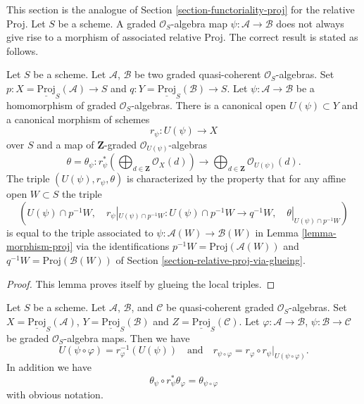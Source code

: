 \noindent
This section is the analogue of Section \ref{section-functoriality-proj}
for the relative Proj. Let $S$ be a scheme. A graded $\mathcal{O}_S$-algebra
map $\psi : \mathcal{A} \to \mathcal{B}$ does not always give rise to a
morphism of associated relative Proj. The correct result is stated as follows.

\begin{lemma}
\label{lemma-morphism-relative-proj}
Let $S$ be a scheme. Let $\mathcal{A}$, $\mathcal{B}$ be two graded
quasi-coherent $\mathcal{O}_S$-algebras. Set
$p : X = \underline{\text{Proj}}_S(\mathcal{A}) \to S$ and
$q : Y = \underline{\text{Proj}}_S(\mathcal{B}) \to S$. Let
$\psi : \mathcal{A} \to \mathcal{B}$ be a homomorphism of
graded $\mathcal{O}_S$-algebras. There is a canonical open
$U(\psi) \subset Y$ and a canonical morphism of schemes
$$
r_\psi :
U(\psi)
\longrightarrow
X
$$
over $S$ and a map of $\mathbf{Z}$-graded $\mathcal{O}_{U(\psi)}$-algebras
$$
\theta = \theta_\psi :
r_\psi^*\left(
\bigoplus\nolimits_{d \in \mathbf{Z}} \mathcal{O}_X(d)
\right)
\longrightarrow
\bigoplus\nolimits_{d \in \mathbf{Z}} \mathcal{O}_{U(\psi)}(d).
$$
The triple $(U(\psi), r_\psi, \theta)$ is characterized by the property
that for any affine open $W \subset S$ the triple
$$
(U(\psi) \cap p^{-1}W,\quad
r_\psi|_{U(\psi) \cap p^{-1}W} : U(\psi) \cap p^{-1}W \to q^{-1}W,\quad
\theta|_{U(\psi) \cap p^{-1}W})
$$
is equal to the triple associated to
$\psi : \mathcal{A}(W) \to \mathcal{B}(W)$ in
Lemma \ref{lemma-morphism-proj} via the identifications
$p^{-1}W = \text{Proj}(\mathcal{A}(W))$ and
$q^{-1}W = \text{Proj}(\mathcal{B}(W))$ of
Section \ref{section-relative-proj-via-glueing}.
\end{lemma}

\begin{proof}
This lemma proves itself by glueing the local triples.
\end{proof}

\begin{lemma}
\label{lemma-morphism-relative-proj-transitive}
Let $S$ be a scheme. Let $\mathcal{A}$, $\mathcal{B}$, and $\mathcal{C}$ be
quasi-coherent graded $\mathcal{O}_S$-algebras.
Set $X = \underline{\text{Proj}}_S(\mathcal{A})$,
$Y = \underline{\text{Proj}}_S(\mathcal{B})$ and
$Z = \underline{\text{Proj}}_S(\mathcal{C})$.
Let $\varphi : \mathcal{A} \to \mathcal{B}$,
$\psi : \mathcal{B} \to \mathcal{C}$ be graded $\mathcal{O}_S$-algebra maps.
Then we have
$$
U(\psi \circ \varphi) = r_\varphi^{-1}(U(\psi))
\quad
\text{and}
\quad
r_{\psi \circ \varphi}
=
r_\varphi \circ r_\psi|_{U(\psi \circ \varphi)}.
$$
In addition we have
$$
\theta_\psi \circ r_\psi^*\theta_\varphi
=
\theta_{\psi \circ \varphi}
$$
with obvious notation.
\end{lemma}

